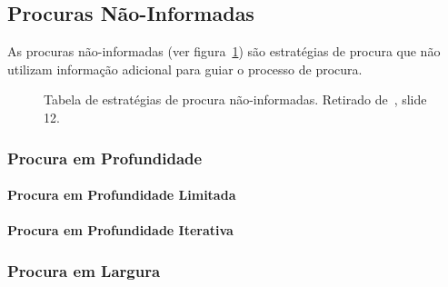 \subsection{Procuras Não-Informadas}\label{subsec:procuras-nao-informadas}

As procuras não-informadas (ver figura~\ref{fig:tabela-estrategias-procura-nao-informadas}) são estratégias de procura que não utilizam informação adicional para guiar o processo de procura.

\begin{figure}[H]
    \label{fig:tabela-estrategias-procura-nao-informadas}
    \begin{center}
    \end{center}
    \caption{Tabela de estratégias de procura não-informadas.
    Retirado de~\cite{isel:iasa:slides:proc-espaco-estados-parte-2}, slide 12.}
\end{figure}

\subsubsection{Procura em Profundidade}\label{subsubsec:procura-profundidade}
\paragraph{Procura em Profundidade Limitada}\label{par:procura-profundidade-limitada}
\paragraph{Procura em Profundidade Iterativa}\label{par:procura-profundidade-iterativa}

\subsubsection{Procura em Largura}\label{subsubsec:procura-largura}

